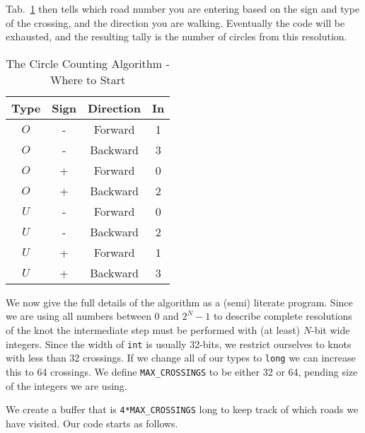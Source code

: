         Tab.~\ref{tab:circle_counting_algorithm_where_start}
        then tells which road number you are entering based on the sign and type
        of the crossing, and the direction you are walking. Eventually the code
        will be exhausted, and the resulting tally is the number of
        circles from this resolution.
        \par\hfill\par
        \begin{table}
            \centering
            \begin{tabular}{c c c c}
                Type&Sign&Direction&In\\
                \hline
                $O$&-&Forward&1\\
                $O$&-&Backward&3\\
                $O$&+&Forward&0\\
                $O$&+&Backward&2\\
                \hline
                $U$&-&Forward&0\\
                $U$&-&Backward&2\\
                $U$&+&Forward&1\\
                $U$&+&Backward&3
            \end{tabular}
            \caption{The Circle Counting Algorithm - Where to Start}
            \label{tab:circle_counting_algorithm_where_start}
        \end{table}
        We now give the full details of the algorithm as a
        (semi) literate program. Since we are using all
        numbers between 0 and $2^{N}-1$ to describe complete resolutions of the
        knot the intermediate step must be performed with (at least) $N$-bit
        wide integers. Since the width of \texttt{int} is usually 32-bits, we
        restrict ourselves to knots with less than 32 crossings. If we change
        all of our types to \texttt{long} we can increase this to 64 crossings.
        We define \texttt{MAX\_CROSSINGS} to be either 32 or 64, pending size
        of the integers we are using.
        \par\hfill\par
        We create a buffer that is \texttt{4*MAX\_CROSSINGS} long to keep track
        of which roads we have visited. Our code starts as follows.

